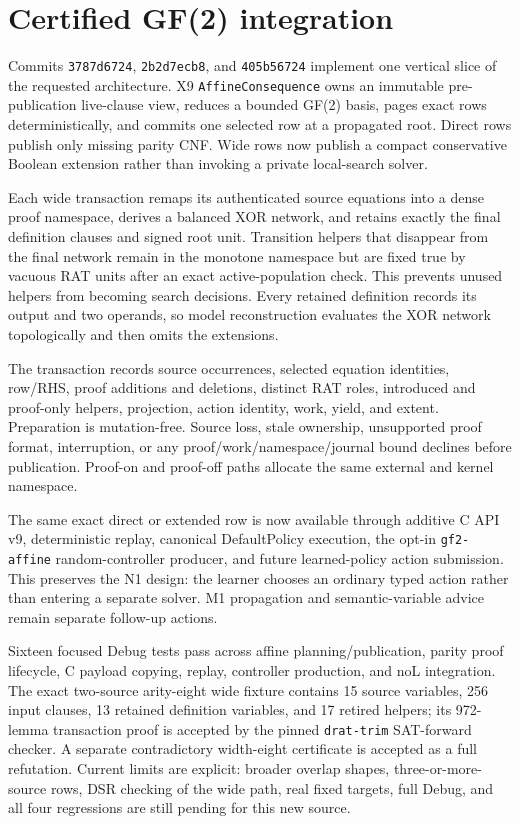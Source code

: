 \documentclass[11pt]{article}
\newcommand{\code}[1]{\texttt{#1}}
\begin{document}
\section*{Certified GF(2) integration}

Commits \code{3787d6724}, \code{2b2d7ecb8}, and \code{405b56724} implement one
vertical slice of the requested architecture.  X9 \code{AffineConsequence}
owns an immutable pre-publication live-clause view, reduces a bounded GF(2)
basis, pages exact rows deterministically, and commits one selected row at a
propagated root.  Direct rows publish only missing parity CNF.  Wide rows now
publish a compact conservative Boolean extension rather than invoking a
private local-search solver.

Each wide transaction remaps its authenticated source equations into a dense
proof namespace, derives a balanced XOR network, and retains exactly the final
definition clauses and signed root unit.  Transition helpers that disappear
from the final network remain in the monotone namespace but are fixed true by
vacuous RAT units after an exact active-population check.  This prevents unused
helpers from becoming search decisions.  Every retained definition records
its output and two operands, so model reconstruction evaluates the XOR network
topologically and then omits the extensions.

The transaction records source occurrences, selected equation identities,
row/RHS, proof additions and deletions, distinct RAT roles, introduced and
proof-only helpers, projection, action identity, work, yield, and extent.
Preparation is mutation-free.  Source loss, stale ownership, unsupported proof
format, interruption, or any proof/work/namespace/journal bound declines
before publication.  Proof-on and proof-off paths allocate the same external
and kernel namespace.

The same exact direct or extended row is now available through additive C API
v9, deterministic replay, canonical DefaultPolicy execution, the opt-in
\code{gf2-affine} random-controller producer, and future learned-policy action
submission.  This preserves the N1 design: the learner chooses an ordinary
typed action rather than entering a separate solver.  M1 propagation and
semantic-variable advice remain separate follow-up actions.

Sixteen focused Debug tests pass across affine planning/publication, parity
proof lifecycle, C payload copying, replay, controller production, and noL
integration.  The exact two-source arity-eight wide fixture contains 15 source
variables, 256 input clauses, 13 retained definition variables, and 17 retired
helpers; its 972-lemma transaction proof is accepted by the pinned
\code{drat-trim} SAT-forward checker.  A separate contradictory width-eight
certificate is accepted as a full refutation.  Current limits are explicit:
broader overlap shapes, three-or-more-source rows, DSR checking of the wide
path, real fixed targets, full Debug, and all four regressions are still
pending for this new source.
\end{document}
